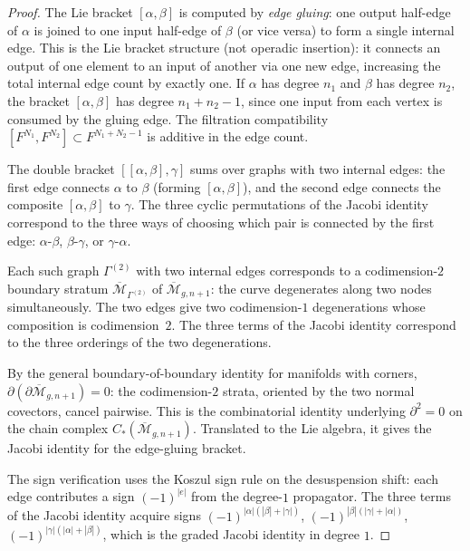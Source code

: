 \begin{proof}
The Lie bracket $[\alpha, \beta]$ is computed by \emph{edge gluing}:
one output half-edge of $\alpha$ is joined to one input half-edge
of $\beta$ (or vice versa) to form a single internal edge. This
is the Lie bracket structure (not operadic insertion): it connects
an output of one element to an input of another via one new edge,
increasing the total internal edge count by exactly one. If
$\alpha$ has degree $n_1$ and $\beta$ has degree $n_2$, the
bracket $[\alpha, \beta]$ has degree $n_1 + n_2 - 1$, since one
input from each vertex is consumed by the gluing edge. The
filtration compatibility $[F^{N_1}, F^{N_2}] \subset
F^{N_1 + N_2 - 1}$ is additive in the edge count.

The double bracket $[[\alpha, \beta], \gamma]$ sums over graphs
with two internal edges: the first edge connects $\alpha$ to
$\beta$ (forming $[\alpha, \beta]$), and the second edge connects
the composite $[\alpha, \beta]$ to $\gamma$. The three cyclic
permutations of the Jacobi identity correspond to the three ways
of choosing which pair is connected by the first edge:
$\alpha$-$\beta$, $\beta$-$\gamma$, or $\gamma$-$\alpha$.

Each such graph $\Gamma^{(2)}$ with two internal edges corresponds
to a codimension-$2$ boundary stratum
$\overline{\mathcal{M}}_{\Gamma^{(2)}}$ of
$\overline{\mathcal{M}}_{g,n+1}$: the curve degenerates along
two nodes simultaneously. The two edges give two codimension-$1$
degenerations whose composition is codimension~$2$. The three
terms of the Jacobi identity correspond to the three orderings
of the two degenerations.

By the general boundary-of-boundary identity for manifolds with
corners, $\partial(\partial \overline{\mathcal{M}}_{g,n+1}) = 0$:
the codimension-$2$ strata, oriented by the two normal covectors,
cancel pairwise. This is the combinatorial identity underlying
$\partial^2 = 0$ on the chain complex
$C_\ast(\overline{\mathcal{M}}_{g,n+1})$. Translated to the
Lie algebra, it gives the Jacobi identity for the edge-gluing
bracket.

The sign verification uses the Koszul sign rule on the
desuspension shift: each edge contributes a sign $(-1)^{|e|}$
from the degree-$1$ propagator. The three terms of the Jacobi
identity acquire signs
$(-1)^{|\alpha|(|\beta| + |\gamma|)}$,
$(-1)^{|\beta|(|\gamma| + |\alpha|)}$,
$(-1)^{|\gamma|(|\alpha| + |\beta|)}$,
which is the graded Jacobi identity in degree $1$.
\end{proof}

